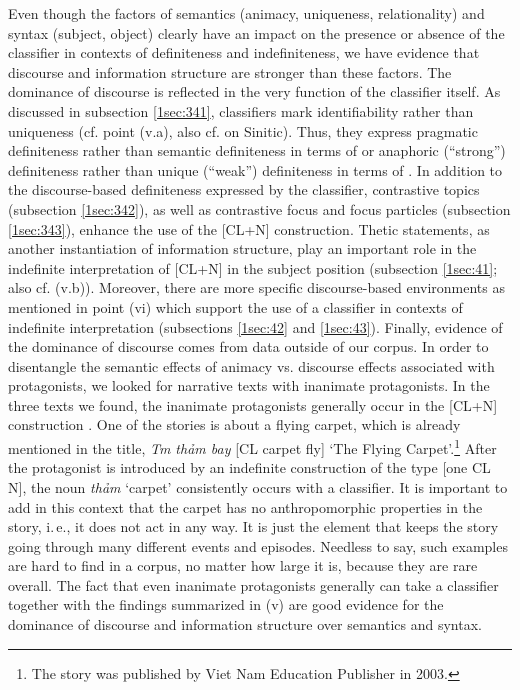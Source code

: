 \documentclass[output=paper]{langsci/langscibook}
\begin{document}
Even though the factors of semantics (animacy, uniqueness, relationality) and syntax (subject, object) clearly have an impact on the presence or absence of the classifier in contexts of definiteness and indefiniteness, we have evidence that discourse and information structure are stronger than these factors. The dominance of discourse is reflected in the very function of the classifier itself. As discussed in subsection \ref{1sec:341}, classifiers mark identifiability rather than uniqueness (cf. point (v.a), also cf. \citealt{li:bisang:12} on Sinitic). Thus, they express pragmatic definiteness rather than semantic definiteness in terms of \cite{lobner:85,lobner:11} or anaphoric (``strong'') definiteness rather than unique (``weak'') definiteness in terms of \cite{schwarz:09,schwarz:13}. In addition to the discourse-based definiteness expressed by the classifier, contrastive topics (subsection \ref{1sec:342}), as well as contrastive focus and focus particles (subsection \ref{1sec:343}), enhance the use of the [CL+N] construction. Thetic statements, as another instantiation of information structure, play an important role in the indefinite interpretation of [CL+N] in the subject position (subsection \ref{1sec:41}; also cf. (v.b)). Moreover, there are more specific discourse-based environments as mentioned in point (vi) which support the use of a classifier in contexts of indefinite interpretation (subsections \ref{1sec:42} and \ref{1sec:43}). Finally, evidence of the dominance of discourse comes from data outside of our corpus. In order to disentangle the semantic effects of animacy vs. discourse effects associated with protagonists, we looked for narrative texts with inanimate protagonists. In the three texts we found, the inanimate protagonists generally occur in the [CL+N] construction \citep{quang:forth}. One of the stories is about a flying carpet, which is already mentioned in the title, {\emph{T{\daa}m thảm bay}} [CL carpet fly] `The Flying Carpet'.\footnote{The story was published by Viet Nam Education Publisher in 2003.} After the protagonist is introduced by an indefinite construction of the type [one CL N], the noun {\emph{thảm}} `carpet' consistently occurs with a classifier. It is important to add in this context that the carpet has no anthropomorphic properties in the story, i.\,e., it does not act in any way. It is just the element that keeps the story going through many different events and episodes. Needless to say, such examples are hard to find in a corpus, no matter how large it is, because they are rare overall. The fact that even inanimate protagonists generally can take a classifier together with the findings summarized in (v) are good evidence for the dominance of discourse and information structure over semantics and syntax.
\end{document}
